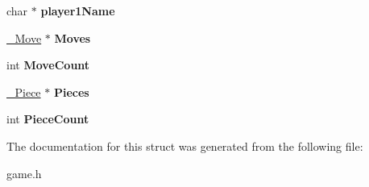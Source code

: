 \begin{DoxyCompactItemize}
\item 
\hypertarget{structConnection_aca48a06e1bff67f7e6796e3064ab29ef}{
char $\ast$ {\bfseries player1Name}}
\label{structConnection_aca48a06e1bff67f7e6796e3064ab29ef}

\item 
\hypertarget{structConnection_a57b1a69a1228dcd76270e1705ec57d4e}{
\hyperlink{struct__Move}{\_\-Move} $\ast$ {\bfseries Moves}}
\label{structConnection_a57b1a69a1228dcd76270e1705ec57d4e}

\item 
\hypertarget{structConnection_a64bf8db3292c97841e76fc1bdc884e94}{
int {\bfseries MoveCount}}
\label{structConnection_a64bf8db3292c97841e76fc1bdc884e94}

\item 
\hypertarget{structConnection_a3944430eb6948118a0deb24e65efa409}{
\hyperlink{struct__Piece}{\_\-Piece} $\ast$ {\bfseries Pieces}}
\label{structConnection_a3944430eb6948118a0deb24e65efa409}

\item 
\hypertarget{structConnection_a8b345a7933c777812ae51646eaa95d98}{
int {\bfseries PieceCount}}
\label{structConnection_a8b345a7933c777812ae51646eaa95d98}

\end{DoxyCompactItemize}


The documentation for this struct was generated from the following file:\begin{DoxyCompactItemize}
\item 
game.h\end{DoxyCompactItemize}
